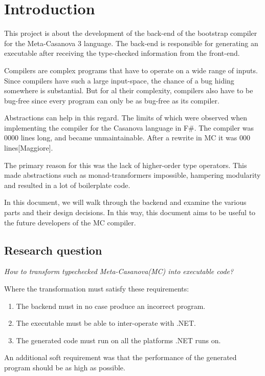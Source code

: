 \section{Introduction}
This project is about the development of the back-end of the bootstrap compiler for the Meta-Casanova 3 language.
The back-end is responsible for generating an executable after receiving the type-checked information from the front-end.

Compilers are complex programs that have to operate on a wide range of inputs.
Since compilers have such a large input-space, the chance of a bug hiding somewhere is substantial. 
But for al their complexity, compilers also have to be bug-free since every program can only be as bug-free as its compiler.

Abstractions can help in this regard.
The limits of which were observed when implementing the compiler for the Casanova language in F\#.
The compiler was 0000 lines long, and became unmaintainable.
After a rewrite in MC it was 000 lines[Maggiore].

The primary reason for this was the lack of higher-order type operators.
This made abstractions such as monad-transformers impossible, hampering modularity and resulted in a lot of boilerplate code.

In this document, we will walk through the backend and examine the various parts and their design decisions.
In this way, this document aims to be useful to the future developers of the MC compiler.

\subsection{Research question}



\textit{How to transform typechecked Meta-Casanova(MC) into executable code?}

Where the transformation must satisfy these requirements:
\begin{enumerate}
    \item The backend must in no case produce an incorrect program.
    \item The executable must be able to inter-operate with .NET.
    \item The generated code must run on all the platforms .NET runs on.
\end{enumerate}

An additional soft requirement was that the performance of the generated program should be as high as possible.

